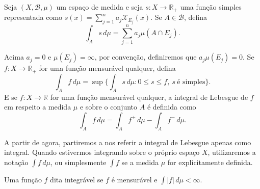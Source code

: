 \begin{definicao}
    Seja $(X, \mathcal{B}, \mu)$ um espaço de medida e seja $s: X \to \mathbb{R}_+ $ uma função simples representada como $s(x) = \sum_{j=1} ^n a_j \mathcal{X}_{E_j} (x)$. Se $A \in \mathcal{B}$, defina
    \begin{equation} \label{intsimples}
        \int _A s \,d\mu  = \sum _{j=1}^n a_j \mu{(A \cap E_j)}. 
    \end{equation}

    Acima $a_j = 0$ e  $\mu(E_j)=\infty$, por convenção, definiremos que $a_j \mu(E_j) = 0$. Se $f: X \to \mathbb{R}_+$ for uma função mensurável qualquer, defina
    \begin{equation} \label{intpositiva}
        \int _ A f \, d\mu = \sup \bigg\{ \int_A s \, d \mu : 0 \leq s \leq f, \ s \ \text{é simples} \bigg\}. 
    \end{equation}
    E se $f: X \to \mathbb{R}$ for uma função mensurável qualquer, a integral de Lebesgue de $f$ em respeito a medida $\mu$ e sobre o conjunto $A$ é definida como 
    \begin{equation} \label{intqualquer}
        \int_A f \, d\mu = \int_A f^+ \, d\mu  - \int_A f^- \, d\mu.
    \end{equation}
\end{definicao}
A partir de agora, partiremos a nos referir a integral de Lebesgue apenas como integral. Quando estivermos integrando sobre o próprio espaço $X$, utilizaremos a notação $\int f\, d\mu$, ou simplesmente $\int f$ se a medida $\mu$ for explicitamente definida.

\begin{definicao}
    Uma função $f$ dita integrável se $f$ é mensurável e $\int |f| \, d \mu < \infty$.
\end{definicao}

